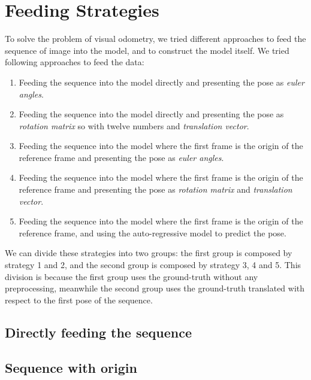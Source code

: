 \section{Feeding Strategies}\label{sec:prediction-strategies}
To solve the problem of visual odometry, we tried different approaches to feed the sequence of image into the model, and to construct the model itself.
We tried following approaches to feed the data:
\begin{enumerate}
    \item Feeding the sequence into the model directly and presenting the pose as \emph{euler angles}.
    \item Feeding the sequence into the model directly and presenting the pose as \emph{rotation matrix} so with twelve numbers and \emph{translation vector}.
    \item Feeding the sequence into the model where the first frame is the origin of the reference frame and presenting the pose as \emph{euler angles}.
    \item Feeding the sequence into the model where the first frame is the origin of the reference frame and presenting the pose as \emph{rotation matrix} and \emph{translation vector}.
    \item Feeding the sequence into the model where the first frame is the origin of the reference frame, and using the auto-regressive model to predict the pose.
\end{enumerate}
We can divide these strategies into two groups: the first group is composed by strategy 1 and 2, and the second group is composed by strategy 3, 4 and 5.
This division is because the first group uses the ground-truth without any preprocessing, meanwhile the second group uses the ground-truth translated with respect to the first pose of the sequence.

\subsection{Directly feeding the sequence}\label{subsec:directly-feeding-the-sequence}

\subsection{Sequence with origin}\label{subsec:sequence-with-origin}
